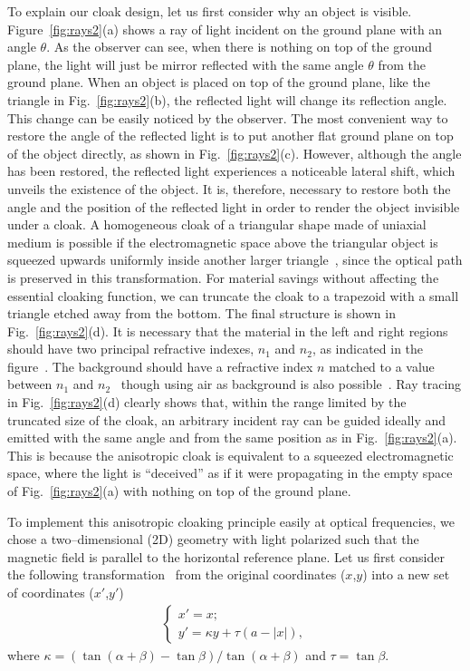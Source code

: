 \documentclass[preprint,preprintnumbers,amsmath,amssymb]{revtex4}
\begin{document}
To explain our cloak design, let us first consider why an object is
visible. Figure~\ref{fig:rays2}(a) shows a ray of light incident on
the ground plane with an angle $\theta$. As the observer can see,
when there is nothing on top of the ground plane, the light will
just be mirror reflected with the same angle $\theta$ from the
ground plane. When an object is placed on top of the ground plane,
like the triangle in Fig.~\ref{fig:rays2}(b), the reflected light
will change its reflection angle. This change can be easily noticed
by the observer. The most convenient way to restore the angle of the
reflected light is to put another flat ground plane on top of the
object directly, as shown in Fig.~\ref{fig:rays2}(c). However,
although the angle has been restored, the reflected light
experiences a noticeable lateral shift, which unveils the existence
of the object. It is, therefore, necessary to restore both the angle
and the position of the reflected light in order to render the
object invisible under a cloak. A homogeneous cloak of a triangular
shape made of uniaxial medium is possible if the electromagnetic
space above the triangular object is squeezed upwards uniformly
inside another larger triangle~\cite{xisheng}, since the optical
path is preserved in this transformation. For material savings
without affecting the essential cloaking function, we can truncate
the cloak to a trapezoid with a small triangle etched away from the
bottom. The final structure is shown in Fig.~\ref{fig:rays2}(d). It
is necessary that the material in the left and right regions should
have two principal refractive indexes, $n_1$ and $n_2$, as indicated
in the figure~\cite{xisheng}. The background should have a
refractive index $n$ matched to a value between $n_1$ and
$n_2$~\cite{zhang10} though using air as background is also
possible~\cite{chen10}. Ray tracing in Fig.~\ref{fig:rays2}(d)
clearly shows that, within the range limited by the truncated size
of the cloak, an arbitrary incident ray can be guided ideally and
emitted with the same angle and from the same position as in
Fig.~\ref{fig:rays2}(a). This is because the anisotropic cloak is
equivalent to a squeezed electromagnetic space, where the light is
``deceived'' as if it were propagating in the empty space of
Fig.~\ref{fig:rays2}(a) with nothing on top of the ground plane.

To implement this anisotropic cloaking principle easily at optical
frequencies, we chose a two--dimensional (2D) geometry with light
polarized such that the magnetic field is parallel to the horizontal
reference plane. Let us first consider the following
transformation~\cite{xisheng} from the original coordinates
($x$,$y$) into a new set of coordinates ($x'$,$y'$)
\begin{eqnarray}
\left\{\begin{array}{c} x'=x;
\\
y' = \kappa y + \tau (a - |x|),
\end{array} \right.
\end{eqnarray}
where $\kappa = (\tan (\alpha + \beta)- \tan \beta) / \tan
(\alpha+\beta)$ and $\tau = \tan \beta$.
\end{document}
